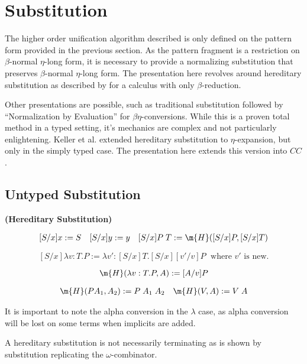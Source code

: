 \section{Substitution}

The higher order unification algorithm described is only defined on the pattern form provided in the previous section.
As the pattern fragment is a restriction on $\beta$-normal $\eta$-long form, it is necessary to provide a normalizing
substitution that preserves $\beta$-normal $\eta$-long form.  The presentation here
revolves around hereditary substitution as described by \citet{pfenning1991logic} for
a calculus with only $\beta$-reduction.

Other presentations are possible, such as traditional substitution followed by ``Normalization by Evaluation''
for $\beta\eta$-conversions\citep{abel2010towards}. 
While this is a proven total method in a typed setting, it's mechanics
are complex and not particularly enlightening.  
Keller et al. \citep{keller2010normalization}
extended hereditary substitution to $\eta$-expansion, but only in the simply typed case. 
The presentation here extends this version into $CC$.

\subsection{Untyped Substitution}

\begin{definition}
\textbf{(Hereditary Substitution)} 

\[ \begin{array}[3]{llr}
[ S / x ] x := S
&
[S / x] y := y
&
[S / x] P\;T := \m{H}([S/x] P, [S/x]T)
\end{array} \]

\[
[S / x] \lambda v : T . P := \lambda v' : [S/x]T . [S/x][v'/v]P
\;
\text{  where $v'$ is new.}
\]

\[ 
\m{H}(\lambda v : T . P , A) := [A/v] P
\]

\[ \begin{array}[2]{lr}
\m{H}(P A_1 , A_2) := P\;A_1\;A_2
&
\m{H}(V , A) := V\; A
\end{array} \]

\label{def:shered}
\end{definition}

It is important to note the alpha conversion in the $\lambda$ case, as alpha conversion will be lost on 
some terms when implicits are added.

A hereditary substitution is not necessarily terminating as is shown by
substitution replicating the $\omega$-combinator.

